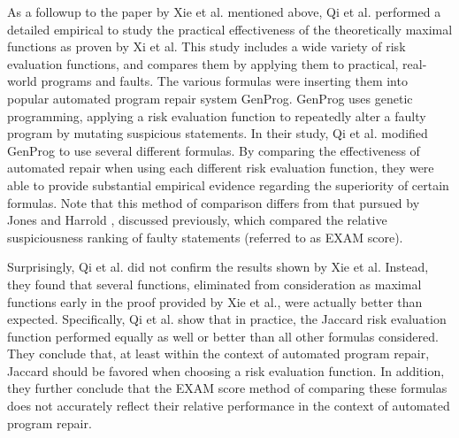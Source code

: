 As a followup to the paper by Xie et al. mentioned above, Qi et al. \hspace*{-0.7mm}\cite{genprog}
performed a detailed empirical to study the practical effectiveness of the 
theoretically maximal functions as proven by Xi et al.  This study includes
a wide variety of risk evaluation functions, and compares them by applying 
them to practical, real-world programs and faults.  The various formulas
were inserting them into popular automated program repair system GenProg.
GenProg uses genetic programming, applying a risk evaluation function to 
repeatedly alter a faulty program by mutating suspicious statements.  In their
study, Qi et al. \hspace*{-0.5mm}modified GenProg to use several different formulas.  By 
comparing the effectiveness of automated repair when using each different 
risk evaluation function, they were able to provide substantial empirical
evidence regarding the superiority of certain formulas.  Note that this method
of comparison differs from that pursued by Jones and Harrold \cite{harrold}, 
discussed previously, which compared the relative suspiciousness ranking of 
faulty statements (referred to as EXAM score).

Surprisingly, Qi et al. did not confirm the results shown by Xie et al.
Instead, they found that several functions, eliminated from consideration
as maximal functions early in the proof provided by Xie et al., were actually 
better than expected. Specifically,
Qi et al. show that in practice, the Jaccard risk evaluation function performed
equally as well or better than all other formulas considered.  They conclude that,
at least within the context of automated program repair, Jaccard should be 
favored when choosing a risk evaluation function.  In addition, they further 
conclude that the EXAM score method of comparing these formulas does not 
accurately reflect their relative performance in the context of automated
program repair.

